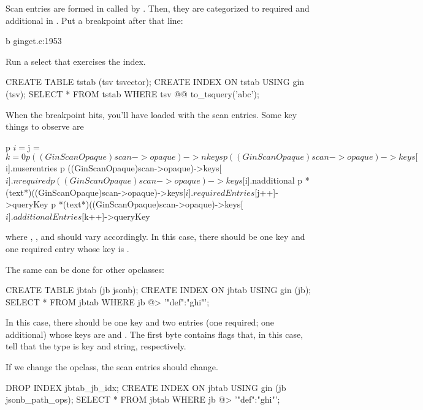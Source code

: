Scan entries are formed in  called by
.  Then, they are categorized to required and additional
in .  Put a breakpoint after that line:

\begin{textcode}
b ginget.c:1953
\end{textcode}

Run a select that exercises the index.

\begin{sqlcode}
CREATE TABLE tstab (tsv tsvector);
CREATE INDEX ON tstab USING gin (tsv);
SELECT * FROM tstab WHERE tsv @@ to_tsquery('abc');
\end{sqlcode}

When the breakpoint hits, you'll have  loaded with
the scan entries.  Some key things to observe are

\begin{textcode}
p $i = $j = $k = 0
p ((GinScanOpaque)scan->opaque)->nkeys
p ((GinScanOpaque)scan->opaque)->keys[$i].nuserentries
p ((GinScanOpaque)scan->opaque)->keys[$i].nrequired
p ((GinScanOpaque)scan->opaque)->keys[$i].nadditional
p *(text*)((GinScanOpaque)scan->opaque)->keys[$i].requiredEntries[$j++]->queryKey
p *(text*)((GinScanOpaque)scan->opaque)->keys[$i].additionalEntries[$k++]->queryKey
\end{textcode}

where , , and  should vary
accordingly.  In this case, there should be one key and one required entry
whose key is .

The same can be done for other opclasses:

\begin{sqlcode}
CREATE TABLE jbtab (jb jsonb);
CREATE INDEX ON jbtab USING gin (jb);
SELECT * FROM jbtab WHERE jb @> '{"def":"ghi"}';
\end{sqlcode}

In this case, there should be one key and two entries (one required; one
additional) whose keys are  and .  The
first byte contains flags that, in this case, tell that the type is key and
string, respectively.

If we change the opclass, the scan entries should change.

\begin{sqlcode}
DROP INDEX jbtab_jb_idx;
CREATE INDEX ON jbtab USING gin (jb jsonb_path_ops);
SELECT * FROM jbtab WHERE jb @> '{"def":"ghi"}';
\end{sqlcode}

